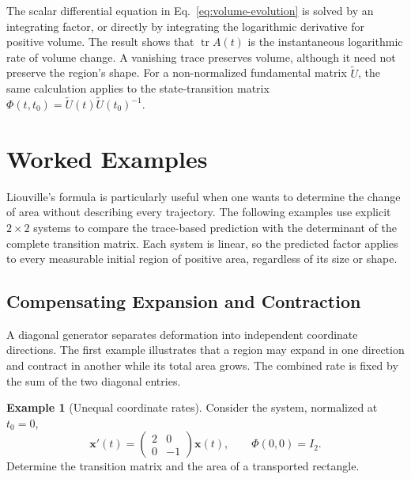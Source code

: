 \documentclass[10pt,a4paper]{article}
\DeclareMathOperator{\tr}{tr}
\numberwithin{equation}{section}
\theoremstyle{definition}
\newtheorem{example}{Example}[section]
\begin{document}
The scalar differential equation in Eq.~\eqref{eq:volume-evolution} is solved by an integrating factor, or directly by integrating the logarithmic derivative for positive volume. The result shows that $\tr A(t)$ is the instantaneous logarithmic rate of volume change. A vanishing trace preserves volume, although it need not preserve the region's shape. For a non-normalized fundamental matrix $\widetilde U$, the same calculation applies to the state-transition matrix $\Phi(t,t_0)=\widetilde U(t)\widetilde U(t_0)^{-1}$.


\section{Worked Examples}

Liouville's formula is particularly useful when one wants to determine the change of area without describing every trajectory. The following examples use explicit $2\times2$ systems to compare the trace-based prediction with the determinant of the complete transition matrix. Each system is linear, so the predicted factor applies to every measurable initial region of positive area, regardless of its size or shape.

\subsection{Compensating Expansion and Contraction}

A diagonal generator separates deformation into independent coordinate directions. The first example illustrates that a region may expand in one direction and contract in another while its total area grows. The combined rate is fixed by the sum of the two diagonal entries.

\begin{example}[Unequal coordinate rates]
Consider the system, normalized at $t_0=0$,
\begin{equation}
\mathbf{x}'(t)=
\begin{pmatrix}2&0\\0&-1\end{pmatrix}\mathbf{x}(t),
\qquad \Phi(0,0)=I_2.
\label{eq:ex-growth-generator}
\end{equation}
Determine the transition matrix and the area of a transported rectangle.
\end{example}
\end{document}
